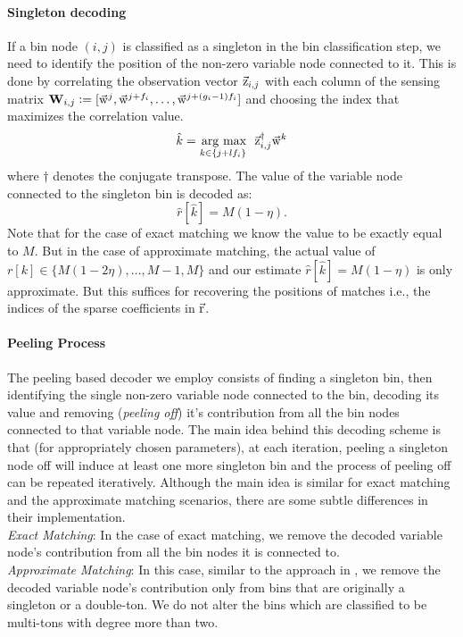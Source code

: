 \paragraph*{Singleton decoding}
If a bin node $(i,j)$ is classified as a singleton in the bin classification step, we need to identify the position of the non-zero variable node connected to it. This is done by correlating the observation vector $\vec{\mathrm{z}}_{i,j}$ with each column of the sensing matrix  $\mathbf{W}_{i,j} \mathrel{\mathop:}= [\vec{\mathrm{w}}^{j},\vec{\mathrm{w}}^{j+f_i},\ldots,   \vec{\mathrm{w}}^{j+(g_i-1)f_i}]$ and choosing the index that maximizes the correlation value.
\begin{align*}
 \hat{k} = \underset{k\in\{j+l f_i\}}{\operatorname*{\,arg\ max}}~~ \vec{\mathrm{z}}^{\dagger}_{i,j} \vec{\mathrm{w}}^{k}
\end{align*}
where $\dagger$ denotes the conjugate transpose. The value of the variable node connected to the singleton bin is decoded as:
 $$
 \hat{r}[\hat{k}]=M(1-\eta).
 $$\vspace{-3pt}
 Note that for the case of exact matching we know the value to be exactly equal to $M$. But in the case of approximate matching, the actual value of $r[k]\in\{M(1-2\eta),\ldots,M-1,M\}$ and our estimate $\hat{r}[\hat{k}]=M(1-\eta)$ is only approximate. But this suffices for recovering the positions of matches i.e., the indices of the sparse coefficients in $\vec{\mathrm{r}}$.			

\paragraph*{Peeling Process} The peeling based decoder we employ consists of finding a singleton bin, then identifying the single non-zero variable node connected to the bin, decoding its value and removing ({\it peeling off}) it's contribution from all the bin nodes connected to that variable node. The main idea behind this decoding scheme is that (for appropriately chosen parameters), at each iteration, peeling a singleton node off will induce at least one more singleton bin and the process of peeling off can be repeated iteratively. Although the main idea is similar for exact matching and the approximate matching scenarios, there are some subtle differences in their implementation.\\
{\it Exact Matching}: In the case of exact matching, we remove the decoded variable node's contribution from all the bin nodes it is connected to.\\
{\it Approximate Matching}: In this case, similar to the approach in \cite{lee2015saffron},  we remove the decoded variable node's contribution only from bins that are originally a singleton or a double-ton. We do not alter the bins which are classified to be multi-tons with degree more than two.


